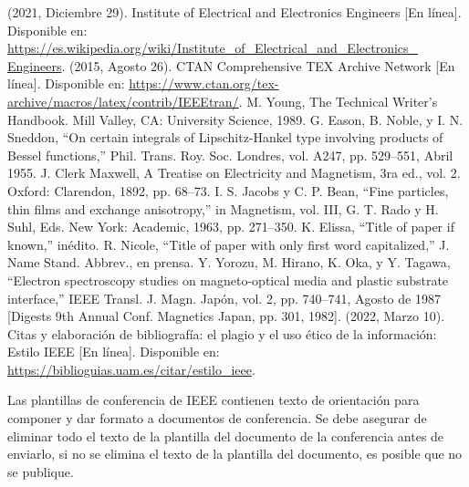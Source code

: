 \documentclass[letterpaper, 10pt, conference]{IEEEtran} %
\begin{document}
	\begin{thebibliography}{00}
		 (2021, Diciembre 29). Institute of Electrical and Electronics Engineers [En línea]. Disponible en: \href{https://es.wikipedia.org/wiki/Institute_of_Electrical_and_Electronics_Engineers}{https://es.wikipedia.org/wiki/Institute\_of\_Electrical\_and\_Electronics\_ Engineers}.
		 (2015, Agosto 26). CTAN Comprehensive TEX Archive Network [En línea]. Disponible en: \href{https://www.ctan.org/tex-archive/macros/latex/contrib/IEEEtran/}{https://www.ctan.org/tex-archive/macros/latex/contrib/IEEEtran/}.
		 M. Young, The Technical Writer's Handbook. Mill Valley, CA: University Science, 1989.
		 G. Eason, B. Noble, y I. N. Sneddon, ``On certain integrals of Lipschitz-Hankel type involving products of Bessel functions,'' Phil. Trans. Roy. Soc. Londres, vol. A247, pp. 529--551, Abril 1955.
		 J. Clerk Maxwell, A Treatise on Electricity and Magnetism, 3ra ed., vol. 2. Oxford: Clarendon, 1892, pp. 68--73.
		 I. S. Jacobs y C. P. Bean, ``Fine particles, thin films and exchange anisotropy,'' in Magnetism, vol. III, G. T. Rado y H. Suhl, Eds. New York: Academic, 1963, pp. 271--350.
		 K. Elissa, ``Title of paper if known,'' inédito.
		 R. Nicole, ``Title of paper with only first word capitalized,'' J. Name Stand. Abbrev., en prensa.
		 Y. Yorozu, M. Hirano, K. Oka, y Y. Tagawa, ``Electron spectroscopy studies on magneto-optical media and plastic substrate interface,'' IEEE Transl. J. Magn. Japón, vol. 2, pp. 740--741, Agosto de 1987 [Digests 9th Annual Conf. Magnetics Japan, pp. 301, 1982].
		 (2022, Marzo 10). Citas y elaboración de bibliografía: el plagio y el uso ético de la información: Estilo IEEE [En línea]. Disponible en: \href{https://biblioguias.uam.es/citar/estilo_ieee}{https://biblioguias.uam.es/citar/estilo\_ieee}.
	\end{thebibliography}
	
	\vspace{12pt}
	\color{red}
	Las plantillas de conferencia de IEEE contienen texto de orientación para componer y dar formato a documentos de conferencia. Se debe asegurar de eliminar todo el texto de la plantilla del documento de la conferencia antes de enviarlo, si no se elimina el texto de la plantilla del documento, es posible que no se publique.
\end{document}
